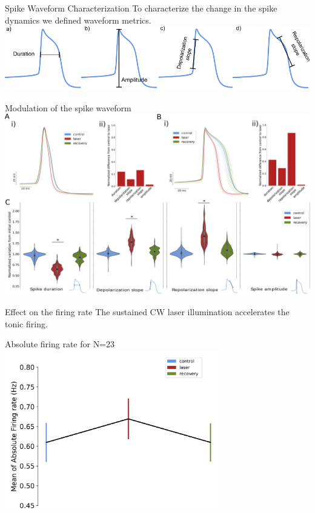 \documentclass[aspectratio=43]{beamer}
\begin{document}
\begin{frame}{Spike Waveform Characterization}
	\centering
	To characterize the change in the spike dynamics we defined waveform metrics. \\
	\vspace{15pt}
	\includegraphics[width=\textwidth]{laser/spike_metrics.pdf}
\end{frame}

\begin{frame}{Modulation of the spike waveform}
	\includegraphics[width=\textwidth]{laser/Figure2.png}
\end{frame}

\begin{frame}{Effect on the firing rate}
	\hypertarget{FRorg}{}
	\centering
	The sustained CW laser illumination accelerates the tonic firing.

	Absolute firing rate for N=23\\
	\hyperlink{extraFR}{
	\includegraphics[width=0.7\textwidth]{Images/frequency-general.pdf}
}
\end{frame}
\end{document}
